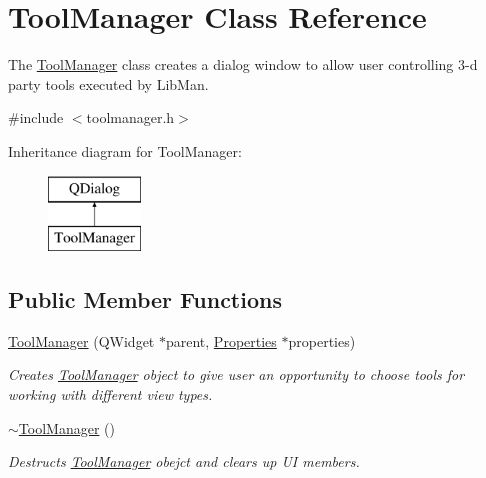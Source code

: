 \hypertarget{classToolManager}{\section{Tool\-Manager Class Reference}
\label{classToolManager}
}


The \hyperlink{classToolManager}{Tool\-Manager} class creates a dialog window to allow user controlling 3-\/d party tools executed by Lib\-Man.  




{\ttfamily \#include $<$toolmanager.\-h$>$}

Inheritance diagram for Tool\-Manager\-:\begin{figure}[H]
\begin{center}
\leavevmode
\includegraphics[height=2.000000cm]{classToolManager}
\end{center}
\end{figure}
\subsection*{Public Member Functions}
\begin{DoxyCompactItemize}
\item 
\hyperlink{classToolManager_ac69e222494ba128594c73d6545e50688}{Tool\-Manager} (Q\-Widget $\ast$parent, \hyperlink{classProperties}{Properties} $\ast$properties)
\begin{DoxyCompactList}\small\item\em Creates \hyperlink{classToolManager}{Tool\-Manager} object to give user an opportunity to choose tools for working with different view types. \end{DoxyCompactList}\item 
\hyperlink{classToolManager_a242d9f322f17b81946a921764ea6c5dd}{$\sim$\-Tool\-Manager} ()
\begin{DoxyCompactList}\small\item\em Destructs \hyperlink{classToolManager}{Tool\-Manager} obejct and clears up U\-I members. \end{DoxyCompactList}\end{DoxyCompactItemize}
